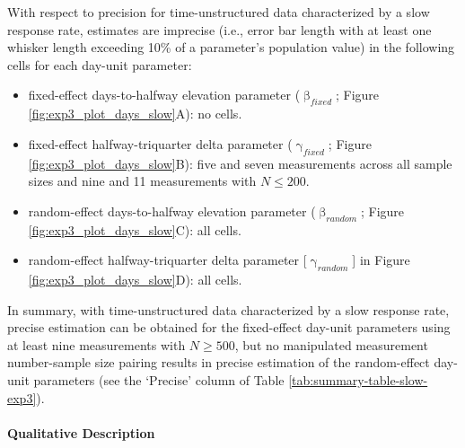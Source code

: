 \documentclass[
12pt, %
twoside,
english]{guelphthesis}
\begin{document}
With respect to precision for time-unstructured data characterized by a slow response rate, estimates are imprecise (i.e., error bar length with at least one whisker length exceeding 10\% of a parameter's population value) in the following cells for each day-unit parameter:
\begin{itemize}
\tightlist
\item
  fixed-effect days-to-halfway elevation parameter (\(\upbeta_{fixed}\); Figure \ref{fig:exp3_plot_days_slow}A): no cells.
\item
  fixed-effect halfway-triquarter delta parameter (\(\upgamma_{fixed}\); Figure \ref{fig:exp3_plot_days_slow}B): five and seven measurements across all sample sizes and nine and 11 measurements with \(N \le 200\).
\item
  random-effect days-to-halfway elevation parameter (\(\upbeta_{random}\); Figure \ref{fig:exp3_plot_days_slow}C): all cells.
\item
  random-effect halfway-triquarter delta parameter {[}\(\upgamma_{random}\){]} in Figure \ref{fig:exp3_plot_days_slow}D): all cells.
\end{itemize}
In summary, with time-unstructured data characterized by a slow response rate, precise estimation can be obtained for the fixed-effect day-unit parameters using at least nine measurements with \(N \ge 500\), but no manipulated measurement number-sample size pairing results in precise estimation of the random-effect day-unit parameters (see the `Precise' column of Table \ref{tab:summary-table-slow-exp3}).

\hypertarget{qualitative-slow-exp3}{%
\paragraph{Qualitative Description}\label{qualitative-slow-exp3}}
\end{document}

